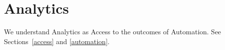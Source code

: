 \section{Analytics}\label{analytics}

We understand Analytics as Access to the outcomes of Automation. See Sections~\ref{access} and \ref{automation}.